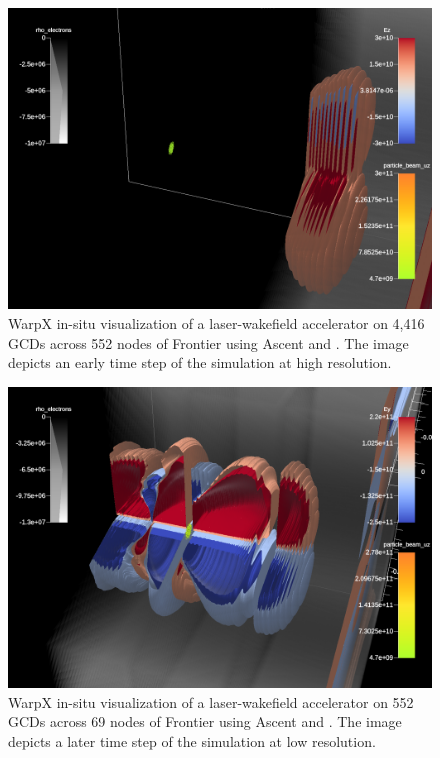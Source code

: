 \begin{figure}[b]
    \centering
    \includegraphics[width=\linewidth]{figures/ez_007050.png}
    \caption{WarpX in-situ visualization of a laser-wakefield accelerator on 4,416 GCDs across 552 nodes of Frontier using Ascent and \vtkm. The image depicts an early time step of the simulation at high resolution.}
    \label{fig:warpx_highres}
\end{figure}

\begin{figure}[t]
    \centering
    \includegraphics[width=\linewidth]{figures/ey_009300.png}
    \caption{WarpX in-situ visualization of a laser-wakefield accelerator on 552 GCDs across 69 nodes of Frontier using Ascent and \vtkm. The image depicts a later time step of the simulation at low resolution.}
    \label{fig:warpx_lowres}
\end{figure}

